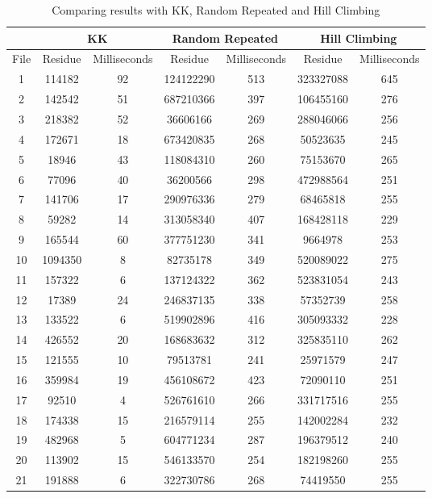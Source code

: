 \documentclass[tikz, 12pt]{scrartcl}
\begin{document}
\begin{longtable}{|c|cc|cc|cc|}
\caption{Comparing results with KK,  Random Repeated and Hill Climbing\label{kkRandomAndHill}}\\
\hline
 	 & \multicolumn{2}{c}{ KK} 	 & \multicolumn{2}{c}{ Random Repeated} 	 & \multicolumn{2}{c|}{ Hill Climbing} \\
\hline
File	 & Residue 	 & 	 Milliseconds	 & Residue 	 & 	 Milliseconds	 & Residue 	 & 	 Milliseconds\\
\hline
1	 &114182	 & 	92	 &124122290	 & 	513	 &323327088	 & 	645\\
2	 &142542	 & 	51	 &687210366	 & 	397	 &106455160	 & 	276\\
3	 &218382	 & 	52	 &36606166	 & 	269	 &288046066	 & 	256\\
4	 &172671	 & 	18	 &673420835	 & 	268	 &50523635	 & 	245\\
5	 &18946	 & 	43	 &118084310	 & 	260	 &75153670	 & 	265\\
6	 &77096	 & 	40	 &36200566	 & 	298	 &472988564	 & 	251\\
7	 &141706	 & 	17	 &290976336	 & 	279	 &68465818	 & 	255\\
8	 &59282	 & 	14	 &313058340	 & 	407	 &168428118	 & 	229\\
9	 &165544	 & 	60	 &377751230	 & 	341	 &9664978	 & 	253\\
10	 &1094350	 & 	8	 &82735178	 & 	349	 &520089022	 & 	275\\
11	 &157322	 & 	6	 &137124322	 & 	362	 &523831054	 & 	243\\
12	 &17389	 & 	24	 &246837135	 & 	338	 &57352739	 & 	258\\
13	 &133522	 & 	6	 &519902896	 & 	416	 &305093332	 & 	228\\
14	 &426552	 & 	20	 &168683632	 & 	312	 &325835110	 & 	262\\
15	 &121555	 & 	10	 &79513781	 & 	241	 &25971579	 & 	247\\
16	 &359984	 & 	19	 &456108672	 & 	423	 &72090110	 & 	251\\
17	 &92510	 & 	4	 &526761610	 & 	266	 &331717516	 & 	255\\
18	 &174338	 & 	15	 &216579114	 & 	255	 &142002284	 & 	232\\
19	 &482968	 & 	5	 &604771234	 & 	287	 &196379512	 & 	240\\
20	 &113902	 & 	15	 &546133570	 & 	254	 &182198260	 & 	255\\
21	 &191888	 & 	6	 &322730786	 & 	268	 &74419550	 & 	255\\

\end{longtable}
\end{document}
